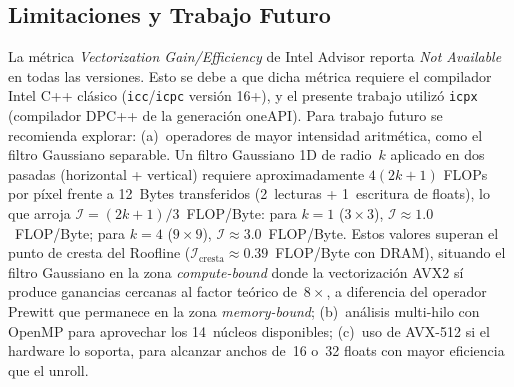\subsection{Limitaciones y Trabajo Futuro}

La m\'etrica \textit{Vectorization Gain/Efficiency} de Intel
Advisor reporta \textit{Not Available} en todas las versiones.
Esto se debe a que dicha m\'etrica requiere el compilador Intel
C++ cl\'asico (\texttt{icc}/\texttt{icpc} versi\'on 16+), y el
presente trabajo utiliz\'o \texttt{icpx} (compilador DPC++ de
la generaci\'on oneAPI).
Para trabajo futuro se recomienda explorar:
(a)~operadores de mayor intensidad aritm\'etica, como el filtro
Gaussiano separable.
Un filtro Gaussiano 1D de radio~$k$ aplicado en dos pasadas
(horizontal + vertical) requiere aproximadamente $4(2k+1)$
FLOPs por p\'ixel frente a 12~Bytes transferidos
(2~lecturas + 1~escritura de floats), lo que arroja
$\mathcal{I} = (2k+1)/3$~FLOP/Byte:
para $k=1$ ($3\times3$), $\mathcal{I} \approx 1.0$~FLOP/Byte;
para $k=4$ ($9\times9$), $\mathcal{I} \approx 3.0$~FLOP/Byte.
Estos valores superan el punto de cresta del Roofline
($\mathcal{I}_{\text{cresta}} \approx 0.39$~FLOP/Byte con DRAM),
situando el filtro Gaussiano en la zona \textit{compute-bound}
donde la vectorizaci\'on AVX2 s\'i produce ganancias cercanas
al factor te\'orico de~$8\times$, a diferencia del operador
Prewitt que permanece en la zona \textit{memory-bound};
(b)~an\'alisis multi-hilo con OpenMP para aprovechar los
14~n\'ucleos disponibles;
(c)~uso de AVX-512 si el hardware lo soporta, para alcanzar
anchos de~16 o~32 floats con mayor eficiencia que el unroll.
